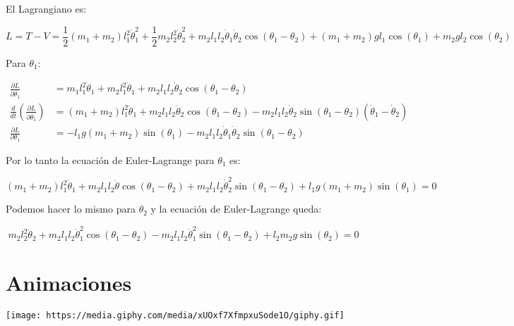 \documentclass[
]{article}
\begin{document}
El Lagrangiano es:

\[
    L = T - V = \frac{1}{2} (m_1+m_2) l_1^2 \dot{\theta}_1^2 + \frac{1}{2} m_2 l_2^2 \dot{\theta}_2^2 + m_2 l_1 l_2 \dot{\theta}_1 \dot{\theta}_2 \cos(\theta_1 - \theta_2) + (m_1+m_2) g l_1 \cos(\theta_1) + m_2 g l_2 \cos(\theta_2)
\]

Para \(\theta_1\):

\[
\begin{aligned}
    \frac{\partial L}{\partial \dot{\theta_1}} &= m_1 l_1^2 \dot{\theta}_1 + m_2 l_1^2 \dot{\theta}_1 + m_2 l_1 l_2 \dot{\theta}_2 \cos(\theta_1 - \theta_2) \\
    \frac{d}{dt} \left( \frac{\partial L}{\partial \dot{\theta_1}} \right) &=  (m_1+m_2) l_1^2 \ddot{\theta}_1 + m_2 l_1 l_2 \ddot{\theta}_2 \cos(\theta_1 - \theta_2) - m_2 l_1 l_2 \dot{\theta}_2 \sin(\theta_1 - \theta_2) (\dot{\theta}_1 - \dot{\theta}_2) \\
    \frac{\partial L}{\partial \theta_1} &= - l_1 g (m_1+m_2) \sin(\theta_1) - m_2 l_1 l_2 \dot{\theta}_1 \dot{\theta}_2 \sin(\theta_1 - \theta_2) 
\end{aligned}
\]

Por lo tanto la ecuación de Euler-Lagrange para \(\theta_1\) es:

\[
    (m_1 + m_2) l_1^2 \ddot{\theta}_1 + m_2 l_1 l_2 \ddot{\theta} \cos(\theta_1 - \theta_2) + m_2 l_1 l_2 \dot{\theta}_2^2 \sin(\theta_1 - \theta_2) + l_1 g (m_1+m_2) \sin(\theta_1) = 0
\]

Podemos hacer lo mismo para \(\theta_2\) y la ecuación de Euler-Lagrange
queda:

\[
    m_2 l_2^2 \ddot{\theta}_2 + m_2 l_1 l_2 \dot{\theta}_1^2 \cos(\theta_1 - \theta_2) - m_2 l_1 l_2 \dot{\theta}_1^2 \sin(\theta_1 - \theta_2) + l_2 m_2 g \sin(\theta_2) = 0
\]

\hypertarget{animaciones}{%
\section{Animaciones}\label{animaciones}}

\texttt{[image: https://media.giphy.com/media/xUOxf7XfmpxuSode1O/giphy.gif]}
\end{document}
